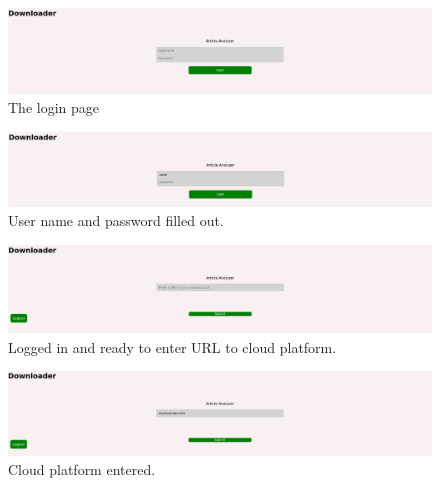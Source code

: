 \documentclass{article}
\title{}
\author{}
\date{}
\begin{document}
    

    \listoffigures

    \newpage

    \begin{figure}[h]
    \includegraphics[scale=.25]{p1}
        \caption{The login page}
    \end{figure}

    \begin{figure}[h]
    \includegraphics[scale=.25]{p2}
        \caption{User name and password filled out.}
    \end{figure}

    \begin{figure}[h]
    \includegraphics[scale=.25]{p3}
        \caption{Logged in and ready to enter URL to cloud platform.}
    \end{figure}

    \begin{figure}[h]
    \includegraphics[scale=.25]{p4}
        \caption{Cloud platform entered.}
    \end{figure}
\end{document}
